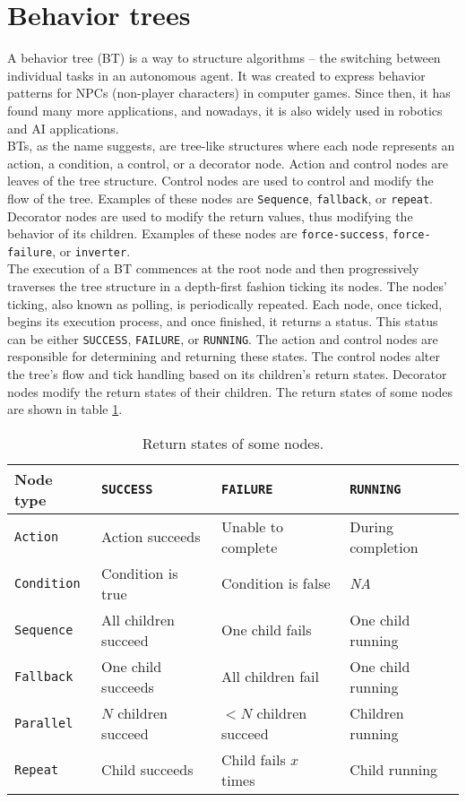 \section{Behavior trees}
    A behavior tree (BT) is a way to structure algorithms -- the switching between individual tasks in an autonomous agent. It was created to express behavior patterns for NPCs (non-player characters) in computer games. Since then, it has found many more applications, and nowadays, it is also widely used in robotics and AI applications.\\
    BTs, as the name suggests, are tree-like structures where each node represents an action, a condition, a control, or a decorator node. Action and control nodes are leaves of the tree structure. Control nodes are used to control and modify the flow of the tree. Examples of these nodes are \texttt{Sequence}, \texttt{fallback}, or \texttt{repeat}. Decorator nodes are used to modify the return values, thus modifying the behavior of its children. Examples of these nodes are \texttt{force-success}, \texttt{force-failure}, or \texttt{inverter}.\\
    The execution of a BT commences at the root node and then progressively traverses the tree structure in a depth-first fashion ticking its nodes. The nodes' ticking, also known as polling, is periodically repeated. Each node, once ticked, begins its execution process, and once finished, it returns a status. This status can be either \texttt{SUCCESS}, \texttt{FAILURE}, or \texttt{RUNNING}. The action and control nodes are responsible for determining and returning these states. The control nodes alter the tree's flow and tick handling based on its children's return states. Decorator nodes modify the return states of their children. The return states of some nodes are shown in table \ref{tab:returns}.
    \begin{table}[H]
        \centering
        \begin{tabular}{|l|l|l|l|}
            \hline
            Node type & \texttt{SUCCESS} & \texttt{FAILURE} & \texttt{RUNNING} \\
            \hline\hline
            \texttt{Action} & Action succeeds & Unable to complete & During completion \\
            \hline
            \texttt{Condition} & Condition is true & Condition is false & \emph{NA} \\
            \hline
            \texttt{Sequence} & All children succeed & One child fails & One child running \\
            \hline
            \texttt{Fallback} & One child succeeds & All children fail & One child running \\
            \hline
            \texttt{Parallel} & $N$ children succeed & $<N$ children succeed & Children running \\
            \hline
            \texttt{Repeat} & Child succeeds & Child fails $x$ times & Child running \\
            \hline
        \end{tabular}
        \caption{Return states of some nodes.}
        \label{tab:returns}
    \end{table}

